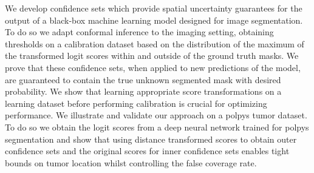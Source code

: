 We develop confidence sets which provide spatial uncertainty guarantees for the output of a black-box machine learning model designed for image segmentation. To do so we adapt conformal inference to the imaging setting, obtaining thresholds on a calibration dataset based on the distribution of the maximum of the transformed logit scores within and outside of the ground truth masks. We prove that these confidence sets, when applied to new predictions of the model, are guaranteed to contain the true unknown segmented mask with desired probability. We show that learning appropriate score transformations on a learning dataset before performing calibration is crucial for optimizing performance. We illustrate and validate our approach on a polpys tumor dataset. To do so we obtain the logit scores from a deep neural network trained for polpys segmentation and show that using distance transformed scores to obtain outer confidence sets and the original scores for inner confidence sets enables tight bounds on tumor location whilst controlling the false coverage rate. 